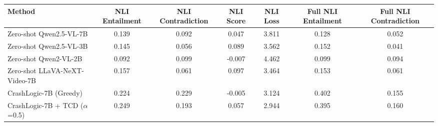 \begin{tabular}{lcccccc}
\toprule
Method & NLI Entailment & NLI Contradiction & NLI Score & NLI Loss & Full NLI Entailment & Full NLI Contradiction \\
\midrule
Zero-shot Qwen2.5-VL-7B & 0.139 & 0.092 & 0.047 & 3.811 & 0.128 & 0.052 \\
Zero-shot Qwen2.5-VL-3B & 0.145 & 0.056 & 0.089 & 3.562 & 0.152 & 0.041 \\
Zero-shot Qwen2-VL-2B & 0.092 & 0.099 & -0.007 & 4.462 & 0.099 & 0.094 \\
Zero-shot LLaVA-NeXT-Video-7B & 0.157 & 0.061 & 0.097 & 3.464 & 0.153 & 0.061 \\
CrashLogic-7B (Greedy) & 0.224 & 0.229 & -0.005 & 3.124 & 0.402 & 0.155 \\
CrashLogic-7B + TCD ($\alpha$=0.5) & 0.249 & 0.193 & 0.057 & 2.944 & 0.395 & 0.160 \\
\bottomrule
\end{tabular}

